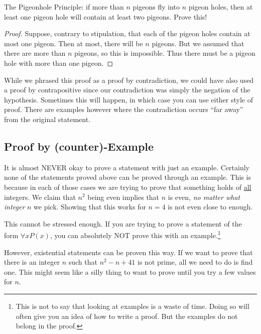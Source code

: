\documentclass[12pt]{article}
\begin{document}
 
\begin{example}
The Pigeonhole Principle: if more than $n$ pigeons fly into $n$ pigeon holes, then at least one pigeon hole will contain at least two pigeons.  Prove this!

\begin{proof}
Suppose, contrary to stipulation, that each of the pigeon holes contain at most one pigeon.  Then at most, there will be $n$ pigeons.  But we assumed that there are more than $n$ pigeons, so this is impossible.  Thus there must be a pigeon hole with more than one pigeon.
\end{proof}

While we phrased this proof as a proof by contradiction, we could have also used a proof by contrapositive since our contradiction was simply the negation of the hypothesis.  Sometimes this will happen, in which case you can use either style of proof.  There are examples however where the contradiction occurs ``far away'' from the original statement.
\end{example} 



 
 
\subsection*{Proof by (counter)-Example}

It is almost NEVER okay to prove a statement with just an example.  Certainly none of the statements proved above can be proved through an example.  This is because in each of those cases we are trying to prove that something holds of \underline{all} integers.  We claim that $n^2$ being even implies that $n$ is even, {\em no matter what integer} $n$ we pick.  Showing that this works for $n = 4$ is not even close to enough.  

This cannot be stressed enough.  If you are trying to prove a statement of the form $\forall x P(x)$, you can absolutely NOT prove this with an example.\footnote{This is not to say that looking at examples is a waste of time.  Doing so will often give you an idea of how to write a proof.  But the examples do not belong in the proof.}

However, existential statements can be proven this way.  If we want to prove that there is an integer $n$ such that $n^2-n+41$ is not prime, all we need to do is find one.  This might seem like a silly thing to want to prove until you try a few values for $n$.  
\end{document}
